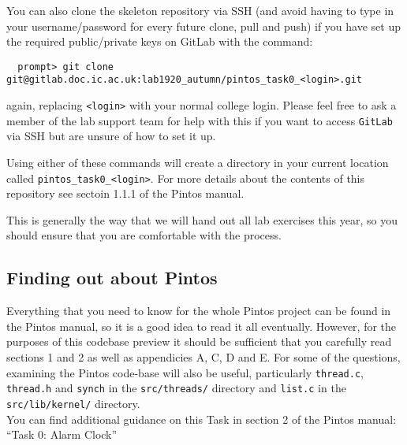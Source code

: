 \documentclass[a4paper,12pt]{article}
\newcommand{\shell}[1]{\lstinline!#1!}
\begin{document}
You can also clone the skeleton repository via SSH (and avoid having to type in your username/password for every future clone, pull and push) if you have set up the required public/private keys on GitLab with the command:
%
\begin{lstlisting}
  prompt> git clone git@gitlab.doc.ic.ac.uk:lab1920_autumn/pintos_task0_<login>.git
\end{lstlisting}
%
again, replacing \shell{<login>} with your normal college login.
Please feel free to ask a member of the lab support team for help with this if you want to access \shell{GitLab} via SSH but are unsure of how to set it up.

Using either of these commands will create a directory in your current location called \shell{pintos_task0_<login>}.
For more details about the contents of this repository see sectoin 1.1.1 of the Pintos manual.

This is generally the way that we will hand out all lab exercises this year, so you should ensure that you are comfortable with the process.


\subsection*{Finding out about Pintos}
Everything that you need to know for the whole Pintos project can be found in the Pintos manual, 
so it is a good idea to read it all eventually.
However, for the purposes of this codebase preview it should be sufficient that you carefully read sections 1 and 2 
as well as appendicies A, C, D and E. 
For some of the questions, examining the Pintos code-base will also be useful, 
particularly \shell{thread.c}, \shell{thread.h} and \shell{synch} in the \shell{src/threads/} directory
and \shell{list.c} in the \shell{src/lib/kernel/} directory.\\

\noindent You can find additional guidance on this Task in section 2 of the Pintos manual: ``Task 0: Alarm Clock''
\end{document}
